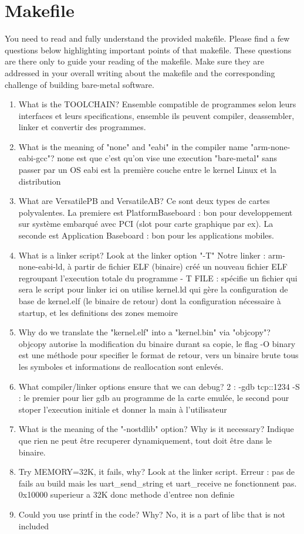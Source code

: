 \documentclass[10]{article}
\begin{document}
\section{Makefile}

You need to read and fully understand the provided makefile.
Please find a few questions below highlighting important points
of that makefile. These questions are there only to guide your
reading of the makefile. Make sure they are addressed in your
overall writing about the makefile and the corresponding challenge
of building bare-metal software.

\begin{enumerate}
\item 
  What is the TOOLCHAIN?
  Ensemble compatible de programmes selon leurs interfaces et leurs specifications, ensemble ils peuvent compiler, deassembler, linker et convertir des programmes.
\item
  What is the meaning of "none" and "eabi" in the compiler
  name "arm-none-eabi-gcc"?
  none est que c'est qu'on vise une execution "bare-metal" sans passer par un OS
  eabi est la première couche entre le kernel Linux et la distribution 
\item
  What are VersatilePB and VersatileAB?
  Ce sont deux types de cartes polyvalentes. La premiere est PlatformBaseboard : bon pour developpement sur système embarqué avec PCI (slot pour carte graphique par ex). La seconde est Application Baseboard : bon pour les applications mobiles.
\item
  What is a linker script? Look at the linker option "-T"
  Notre linker : arm-none-eabi-ld, à partir de fichier ELF (binaire) créé un nouveau fichier ELF regroupant l'execution totale du programme
  - T FILE : spécifie un fichier qui sera le script pour linker 
  ici on utilise kernel.ld qui gère la configuration de base de kernel.elf (le binaire de retour) dont la configuration nécessaire à startup, et les definitions des zones memoire
\item
  Why do we translate the "kernel.elf" into a "kernel.bin" via "objcopy"?
  objcopy autorise la modification du binaire durant sa copie, le flag -O binary est une méthode pour specifier le format de retour, vers un binaire brute tous les symboles et informations de reallocation sont enlevés.
\item
  What compiler/linker options ensure that we can debug?
  2 : -gdb tcp::1234 -S : le premier pour lier gdb au programme de la carte emulée, le second pour stoper l'execution initiale et donner la main à l'utilisateur
\item
  What is the meaning of the "-nostdlib" option? Why is it necessary?
  Indique que rien ne peut être recuperer dynamiquement, tout doit être dans le binaire.
\item
  Try MEMORY=32K, it fails, why? Look at the linker script.
  Erreur : pas de fails au build mais les uart_send_string et uart_receive ne fonctionnent pas. 0x10000 superieur a 32K donc methode d'entree non definie
\item
  Could you use printf in the code? Why?
  No, it is a part of libc that is not included
\end{enumerate}
\end{document}
